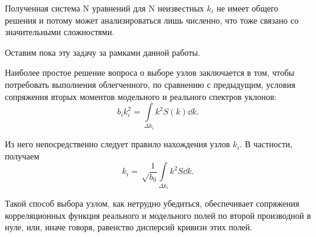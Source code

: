 Полученная система N уравнений для N неизвестных $k_i$ не имеет общего решения и потому может анализироваться лишь численно, что тоже связано со значительными сложностями.

Оставим пока эту задачу за рамками данной работы.

Наиболее простое решение вопроса о выборе узлов заключается в том, чтобы потребовать выполнения облегченного, по сравнению с предыдущим, условия сопряжения вторых моментов модельного и реального спектров уклонов:
\begin{equation}
	b_i k_i^2=\int\limits_{\Delta k_i} k^2 S(k)  \dd{k}.
\end{equation}

Из него непосредственно следует правило нахождения узлов $k_i$. В частности, получаем
\begin{equation}
	k_i=\sqrt\frac{1}{b_0} \int\limits_{\Delta k_i} k^2 S \dd{k}.
\end{equation}

Такой способ выбора узлом, как нетрудно убедиться, обеспечивает сопряжения корреляционных функция реального и модельного полей по второй производной в нуле, или, иначе говоря, равенство дисперсий кривизн этих полей. 






